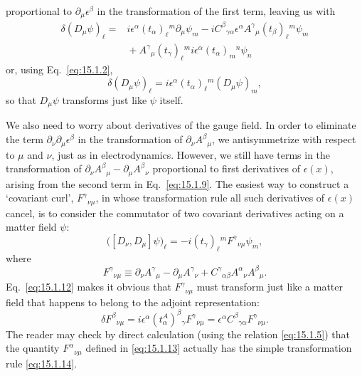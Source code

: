 proportional to $\partial_\mu\epsilon^\beta$ in the transformation of the first
term, leaving us with
\begin{align*}
 \delta(D_\mu\psi)_\ell={}&i\epsilon^\alpha(t_\alpha)_\ell{}^m
 \partial_\mu\psi_m-iC^\beta{}_{\gamma\alpha}\epsilon^\alpha
 A^\gamma{}_\mu(t_\beta)_\ell{}^m\psi_m\\
 &{}+A^\gamma{}_\mu(t_\gamma)_\ell{}^m
 i\epsilon^\alpha(t_\alpha)_m{}^n\psi_n
\end{align*}
or, using Eq.~\eqref{eq:15.1.2},
\begin{equation}
 \delta(D_\mu\psi)_\ell=i\epsilon^\alpha(t_\alpha)_\ell{}^m(D_\mu\psi)_m ,
 \tag{15.1.11}\label{eq:15.1.11}
\end{equation}
so that $D_\mu\psi$ transforms just like $\psi$ itself.

We also need to worry about derivatives of the gauge field. In order to eliminate
the term $\partial_\nu\partial_\mu\epsilon^\beta$ in the transformation of
$\partial_\nu A^\beta{}_\mu$, we antisymmetrize with respect to $\mu$ and $\nu$,
just as in electrodynamics. However, we still have terms in the transformation of
$\partial_\nu A^\beta{}_\mu-\partial_\mu A^\beta{}_\nu$ proportional to first
derivatives of $\epsilon(x)$, arising from the second term in
Eq.~\eqref{eq:15.1.9}. The easiest way to construct a `covariant curl',
$F^\gamma{}_{\nu\mu}$, in whose transformation rule all such derivatives of
$\epsilon(x)$ cancel, is to consider the commutator of two covariant derivatives
acting on a matter field $\psi$:
\begin{equation}
 \bigl([D_\nu,D_\mu]\psi\bigr)_\ell
 =-i(t_\gamma)_\ell{}^m F^\gamma{}_{\nu\mu}\psi_m ,
 \tag{15.1.12}\label{eq:15.1.12}
\end{equation}
where
\begin{equation}
 F^\gamma{}_{\nu\mu}\equiv\partial_\nu A^\gamma{}_\mu
 -\partial_\mu A^\gamma{}_\nu
 +C^\gamma{}_{\alpha\beta}A^\alpha{}_\nu A^\beta{}_\mu .
 \tag{15.1.13}\label{eq:15.1.13}
\end{equation}
Eq.~\eqref{eq:15.1.12} makes it obvious that $F^\gamma{}_{\nu\mu}$ must
transform just like a matter field that happens to belong to the adjoint
representation:
\begin{equation}
 \delta F^\beta{}_{\nu\mu}
 =i\epsilon^\alpha(t^A_\alpha)^\beta{}_\gamma F^\gamma{}_{\nu\mu}
 =\epsilon^\alpha C^\beta{}_{\gamma\alpha}F^\gamma{}_{\nu\mu} .
 \tag{15.1.14}\label{eq:15.1.14}
\end{equation}
The reader may check by direct calculation (using the relation
\eqref{eq:15.1.5}) that the quantity $F^\alpha{}_{\nu\mu}$ defined in
\eqref{eq:15.1.13} actually has the simple transformation rule
\eqref{eq:15.1.14}.

